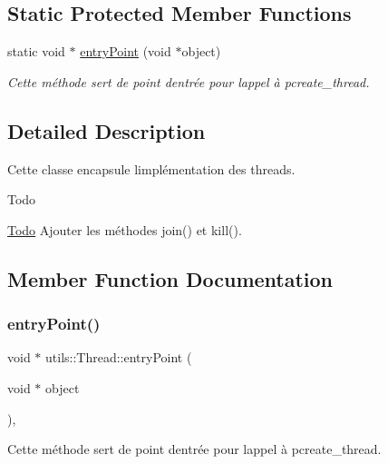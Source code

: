 \subsection*{Static Protected Member Functions}
\begin{DoxyCompactItemize}
\item 
static void $\ast$ \hyperlink{classutils_1_1Thread_a61b6c3d0b87570254646120b323b89f7}{entry\+Point} (void $\ast$object)
\begin{DoxyCompactList}\small\item\em Cette méthode sert de point d\textquotesingle{}entrée pour l\textquotesingle{}appel à pcreate\+\_\+thread. \end{DoxyCompactList}\end{DoxyCompactItemize}


\subsection{Detailed Description}
Cette classe encapsule l\textquotesingle{}implémentation des threads. 

\begin{DoxyRefDesc}{Todo}
\item[\hyperlink{todo__todo000004}{Todo}]Ajouter les méthodes join() et kill(). \end{DoxyRefDesc}


\subsection{Member Function Documentation}
\mbox{\label{classutils_1_1Thread_a61b6c3d0b87570254646120b323b89f7}} 
\subsubsection{\texorpdfstring{entry\+Point()}{entryPoint()}}
{\footnotesize\ttfamily void $\ast$ utils\+::\+Thread\+::entry\+Point (\begin{DoxyParamCaption}\item[{void $\ast$}]{object }\end{DoxyParamCaption})\hspace{0.3cm}{\ttfamily [static]}, {\ttfamily [protected]}}



Cette méthode sert de point d\textquotesingle{}entrée pour l\textquotesingle{}appel à pcreate\+\_\+thread. 


